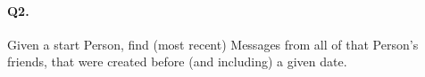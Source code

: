 \paragraph{Q2.}
Given a start Person, find (most recent) Messages from all of that
Person's friends, that were created before (and including) a given date.
